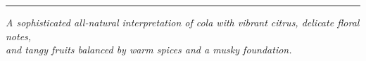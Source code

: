 \documentclass{article}
\begin{document}
\vspace{1cm}
\begin{center}
\textcolor{violetPurple}{\rule{0.8\textwidth}{0.4pt}}
\end{center}

\begin{center}
\textit{\textcolor{colaDark}{A sophisticated all-natural interpretation of cola with vibrant citrus, delicate floral notes,\\
and tangy fruits balanced by warm spices and a musky foundation.}}
\end{center}
\end{document}
